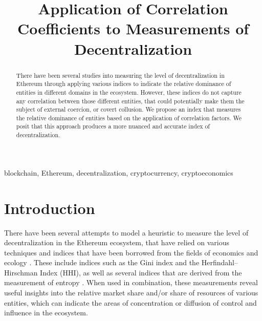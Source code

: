 \documentclass[conference]{IEEEtran}
\begin{document}
\title{Application of Correlation Coefficients to Measurements of Decentralization}

\author{
  \and
}

\maketitle

\begin{abstract}
There have been several studies into measuring the level of decentralization in Ethereum through applying various indices to indicate the relative dominance of entities in different domains in the ecosystem.  However, these indices do not capture any correlation between those different entities, that could potentially make them the subject of external coercion, or covert collusion.  We propose an  index that measures the relative dominance of entities based on the application of correlation factors.  We posit that this approach produces a more nuanced and accurate index of decentralization.
\end{abstract}

\begin{IEEEkeywords}
blockchain, Ethereum, decentralization, cryptocurrency, cryptoeconomics
\end{IEEEkeywords}

\section{Introduction}

There have been several attempts to model a heuristic to measure the level of decentralization in the Ethereum ecosystem, that have relied on various techniques and indices that have been borrowed from the fields of economics and ecology \cite{wu2020coefficient} \cite{gupta2018gini} \cite{gochhayat2020measuring} \cite{lee2021dq}.  These include indices such as the Gini index and the Herfindahl–Hirschman Index (HHI), as well as several indices that are derived from the measurement of entropy \cite{brown2023measuring}.  When used in combination, these measurements reveal useful insights into the relative market share and/or share of resources of various entities, which can indicate the areas of concentration or diffusion of control and influence in the ecosystem.
\end{document}

